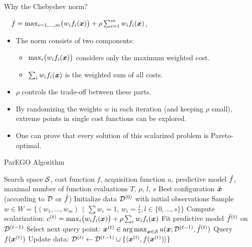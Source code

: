 \documentclass[11pt,compress,t,notes=noshow,xcolor=table]{beamer}
\begin{document}
\begin{framev}{Why the Chebyshev norm?}
\begin{center}
\end{center}
$\quad f = \max_{i=1,\dots,m}\bigl(w_i \fkx[i]\bigr) 
+ \rho \sum_{i=1}^m w_i \fkx[i]$,
\begin{scriptsize}
\begin{itemize}
\item The norm consists of two components:
\begin{itemize}
\item $\max_{i}\bigl(w_i \fkx[i]\bigr)$ 
considers only the maximum weighted cost.
\item $\sum_{i} w_i\fkx[i]$ is the weighted sum of all costs.
\end{itemize}
\item $\rho$ controls the trade-off between these parts.
\item By randomizing the weights $w$ in each iteration (and keeping $\rho$ small), 
extreme points in single cost functions can be explored.
\item One can prove that every solution of this scalarized problem is 
Pareto-optimal.
\end{itemize}
\end{scriptsize}
\end{framev}


\begin{framev}[fs=small]{ParEGO Algorithm}
\begin{center}
\begin{algorithm}[H]
\caption{ParEGO loop}
\begin{algorithmic}[1]
\Require Search space $\S$, cost function $f$, acquisition function $u$, predictive model $\fh$, maximal number of function evaluations $T$, $\rho$, $l$, $s$
\Ensure Best configuration $\hat{\xv}$ (according to $\D$ or $\fh$)
\State Initialize data $\D^{(0)}$ with initial observations
\State Sample $w \in W = \bigl\{(w_1,\dots,w_m) \,\mid\, \sum w_i = 1,\, w_i = \tfrac{l}{s}, l \in \{0,\dots,s\}\bigr\}$
\State Compute scalarization: $c^{(t)} = \max_{i}\bigl(w_i \fkx[i]\bigr) + \rho \sum_{i}w_i\fkx[i]$
\State Fit predictive model $\fh^{(t)}$ on $\D^{(t-1)}$
\State Select next query point: $\xv^{(t)} \in \argmax_{\xv \in \S} u(\xv; \D^{(t-1)}, \fh^{(t)})$
\State Query $f(\xv^{(t)})$
\State Update data: $\D^{(t)} \leftarrow \D^{(t-1)} \cup \{\langle \xv^{(t)}, f(\xv^{(t)}) \rangle\}$
\EndFor
\end{algorithmic}
\end{algorithm}
\end{center}
\end{framev}
\end{document}
